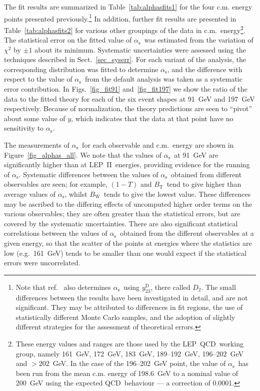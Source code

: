 \documentclass[12pt,a4paper,twoside]{article}
\newcommand{\as}     {\ensuremath{\alpha_{\mathrm{s}}}}
\newcommand{\bt}     {\ensuremath{B_{\mathrm{T}}}}
\newcommand{\bw}     {\ensuremath{B_{\mathrm{W}}}}
\newcommand{\ytwothree}   {\ensuremath{y^{\mathrm{D}}_{23}}}
\newcommand{\Lep}{\mbox{LEP}}
\newcommand{\qcd}{\mbox{QCD}}
\newcommand{\Leptwo}{\mbox{\rm LEP II}}
\begin{document}
The fit results are summarized in Table~\ref{tab:alphasfits1} for the
four c.m. energy points presented previously.\footnote{
Note that ref.~\cite{OPALjets} also determines \as\ using
\ytwothree, there called $D_2$.  The small differences between the results
have been investigated in detail, and are not significant.  They may 
be attributed to differences in fit regions, 
the use of statistically different Monte Carlo samples, and
the adoption of slightly different strategies for the assessment of 
theoretical errors.}
In addition, further fit results are presented in  
Table~\ref{tab:alphasfits2} for various other groupings of the data in
c.m.\ energy\footnote{These energy values and ranges 
are those used by the \Lep~\qcd\ working group, namely
161~GeV, 172~GeV, 183~GeV, 189--192~GeV, 196--202~GeV and 
$>202$~GeV.  In the case of the 196--202~GeV point, the value of 
\as\ has been run from the mean c.m. energy of 198.6~GeV
to a nominal value of 200~GeV using the expected \qcd\ behaviour ---
a correction of 0.0001.}.  
The statistical error on the fitted value of \as\ was
estimated from the variation of $\chi^2$ by $\pm1$ about
its minimum.  Systematic uncertainties were assessed using the
techniques described in Sect.~\ref{sec_syserr}.  For each variant of the 
analysis, the corresponding distribution was fitted 
to determine \as, and the difference with respect to 
the value of \as\ from 
the default analysis was taken as a systematic error contribution.
In Figs.~\ref{fig_fit91} and~\ref{fig_fit197} we show the ratio of the 
data to the fitted theory for each of the six event shapes at
91~GeV and 197~GeV respectively.  Because of normalization, the theory predictions 
are seen to ``pivot'' about some value of $y$, which indicates that the data at that
point have no sensitivity to \as.    

The measurements of \as\ for each observable and c.m.\ energy
are shown in Figure~\ref{fig_alphas_all}.  We note that the 
values of \as\ at 91~GeV are significantly higher than at \Leptwo\
energies, providing evidence for the running of \as.
Systematic differences between the values of \as\ obtained from different 
observables are seen; for example, $(1-T)$ and \bt\ tend to give
higher than average values of \as, whilst \bw\ tends to give the lowest value.
These differences may be ascribed to the differing effects of
uncomputed higher order terms on the various observables; they
are often greater than the statistical errors, but are  
covered by the systematic uncertainties.
There are also significant statistical correlations
between the values of \as\ obtained from the different observables
at a given energy, so that the scatter of the points at
energies where the statistics are low (e.g.\ 161~GeV) tends to 
be smaller than one would expect if the statistical errors  were
uncorrelated. 
\end{document}
